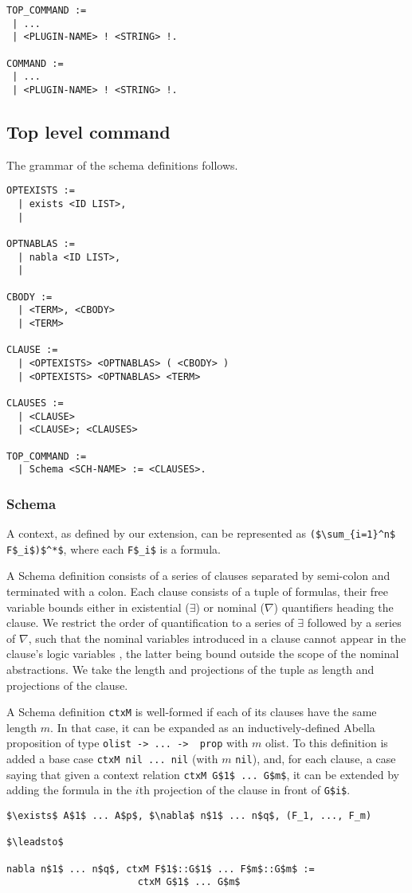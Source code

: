 \documentclass[nocopyrightspace,authoryear]{sigplanconf}
\begin{document}
\begin{lstlisting}
TOP_COMMAND :=
 | ...
 | <PLUGIN-NAME> ! <STRING> !.

COMMAND :=
 | ...
 | <PLUGIN-NAME> ! <STRING> !.
\end{lstlisting}



\subsection{Top level command}
The grammar of the schema definitions follows.

\begin{lstlisting}
OPTEXISTS :=
  | exists <ID LIST>, 
  |

OPTNABLAS :=
  | nabla <ID LIST>,
  |

CBODY :=
  | <TERM>, <CBODY>
  | <TERM>

CLAUSE :=
  | <OPTEXISTS> <OPTNABLAS> ( <CBODY> )
  | <OPTEXISTS> <OPTNABLAS> <TERM>

CLAUSES :=
  | <CLAUSE>
  | <CLAUSE>; <CLAUSES>

TOP_COMMAND :=
  | Schema <SCH-NAME> := <CLAUSES>.
\end{lstlisting} 

\subsubsection{Schema}
A context, as defined by our extension, can be represented as \lstinline|($\sum_{i=1}^n$ F$_i$)$^*$|, where each \lstinline|F$_i$| is a formula. 

A Schema definition consists of a series of clauses separated by semi-colon and terminated with a colon. Each clause consists of a tuple of formulas, their free variable bounds either in existential ($\exists$) or  nominal ($\nabla$) quantifiers heading the clause. We restrict the order of quantification to a series of $\exists$ followed by a series of $\nabla$, such that the nominal variables introduced in a clause cannot appear in the clause's logic variables , the latter being bound outside the scope of the nominal abstractions. We take the length and projections of the tuple as length and projections of the clause.

A Schema definition \lstinline|ctxM| is well-formed if each of its clauses have the same length $m$. In that case, it can be expanded as an inductively-defined Abella proposition of type \lstinline|olist -> ... ->  prop| with $m$ olist. To this definition is added a base case \lstinline|ctxM nil ... nil| (with $m$ \lstinline|nil|), and, for each clause, a case saying that given a context relation \lstinline|ctxM G$1$ ... G$m$|, it can be extended by adding the formula in the $i$th projection of the clause in front of \lstinline|G$i$|.
\begin{lstlisting}
$\exists$ A$1$ ... A$p$, $\nabla$ n$1$ ... n$q$, (F_1, ..., F_m)

$\leadsto$

nabla n$1$ ... n$q$, ctxM F$1$::G$1$ ... F$m$::G$m$ := 
                       ctxM G$1$ ... G$m$
\end{lstlisting}
\end{document}

